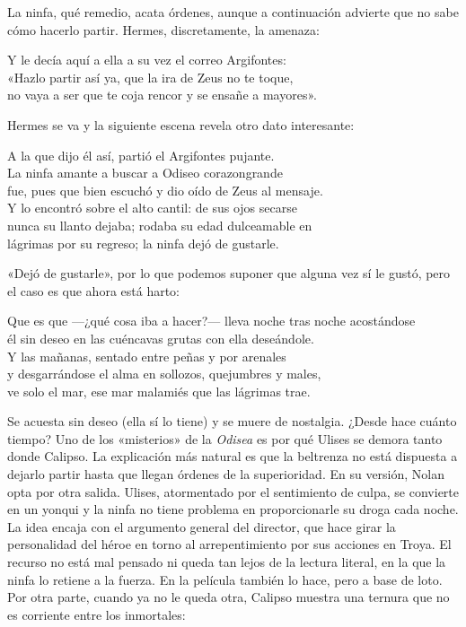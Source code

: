 La ninfa, qué remedio, acata órdenes, aunque a continuación advierte que no sabe cómo hacerlo partir. Hermes, discretamente, la amenaza:

\begin{versocita}
Y le decía aquí a ella a su vez el correo Argifontes:\\
«Hazlo partir así ya, que la ira de Zeus no te toque,\\
no vaya a ser que te coja rencor y se ensañe a mayores».
\end{versocita}

Hermes se va y la siguiente escena revela otro dato interesante:

\begin{versocita}
A la que dijo él así, partió el Argifontes pujante.\\
La ninfa amante a buscar a Odiseo corazongrande\\
fue, pues que bien escuchó y dio oído de Zeus al mensaje.\\
Y lo encontró sobre el alto cantil: de sus ojos secarse\\
nunca su llanto dejaba; rodaba su edad dulceamable en\\
lágrimas por su regreso; la ninfa dejó de gustarle.
\end{versocita}

«Dejó de gustarle», por lo que podemos suponer que alguna vez sí le gustó, pero el caso es que ahora está harto:

\begin{versocita}
Que es que ---¿qué cosa iba a hacer?--- lleva noche tras noche acostándose\\
él sin deseo en las cuéncavas grutas con ella deseándole.\\
Y las mañanas, sentado entre peñas y por arenales\\
y desgarrándose el alma en sollozos, quejumbres y males,\\
ve solo el mar, ese mar malamiés que las lágrimas trae.
\end{versocita}

Se acuesta sin deseo (ella sí lo tiene) y se muere de nostalgia. ¿Desde hace cuánto tiempo? Uno de los «misterios» de la \emph{Odisea} es por qué Ulises se demora tanto donde Calipso. La explicación más natural es que la beltrenza no está dispuesta a dejarlo partir hasta que llegan órdenes de la superioridad. En su versión, Nolan opta por otra salida. Ulises, atormentado por el sentimiento de culpa, se convierte en un yonqui y la ninfa no tiene problema en proporcionarle su droga cada noche. La idea encaja con el argumento general del director, que hace girar la personalidad del héroe en torno al arrepentimiento por sus acciones en Troya. El recurso no está mal pensado ni queda tan lejos de la lectura literal, en la que la ninfa lo retiene a la fuerza. En la película también lo hace, pero a base de loto. Por otra parte, cuando ya no le queda otra, Calipso muestra una ternura que no es corriente entre los inmortales:

